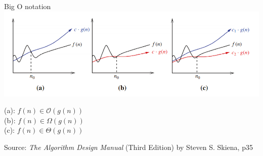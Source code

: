 \begin{frame}{Big O notation}
%
\includegraphics[width=\linewidth]{./gfx/BigOSymbols}
%
{\scriptsize
\begin{center}
(a): $f(n) \in \mathcal{O}(g(n))$\\
(b): $f(n) \in \Omega(g(n))$\\
(c): $f(n) \in \Theta(g(n))$
\end{center}
Source: \emph{The Algorithm Design Manual} (Third Edition) by Steven S. Skiena, p35
}
%
\end{frame}


